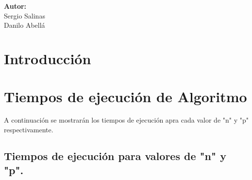 \documentclass[12pt,letterpaper]{scrartcl}
\begin{document}
\begin{titlepage}
\begin{center}
\begin{minipage}[l]{0.4\textwidth}
	\begin{flushright}

		\textbf{\textsf{Autor:}}\\
		\linespread{1}
		\large Sergio Salinas\\
		\large Danilo Abellá\\

	\end{flushright}
\end{minipage}

\end{center}

\end{titlepage}



\newpage
\section*{Introducción}


\section{Tiempos de ejecución de Algoritmo}

A continuación se mostrarán los tiempos de ejecución apra cada valor de "n" y "p" respectivamente.

\subsection{Tiempos de ejecución para valores de "n" y "p".}
\end{document}
